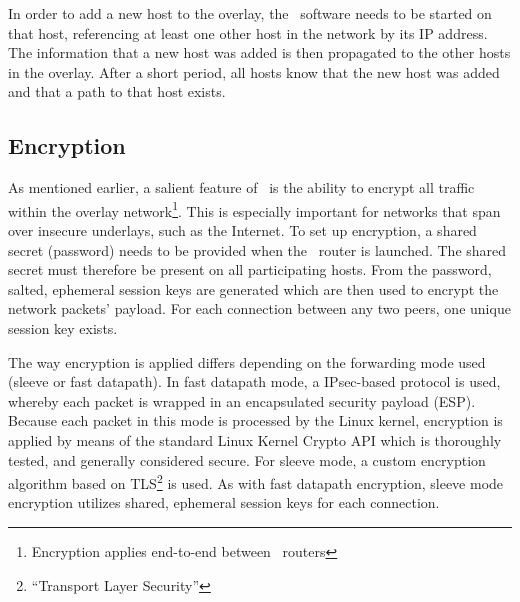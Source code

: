 In order to add a new host to the overlay, the \weave\ software needs to be started on that host, referencing at least one other host in the network by its IP address. The information that a new host was added is then propagated to the other hosts in the overlay. After a short period, all hosts know that the new host was added and that a path to that host exists.

\subsection{Encryption} 
As mentioned earlier, a salient feature of \wnet\ is the ability to encrypt all traffic within the overlay network\footnote{Encryption applies end-to-end between \weave\ routers}. This is especially important for networks that span over insecure underlays, such as the Internet. To set up encryption, a shared secret (password) needs to be provided when the \weave\ router is launched. The shared secret must therefore be present on all participating hosts. From the password, salted, ephemeral session keys are generated which are then used to encrypt the network packets' payload. For each connection between any two peers, one unique session key exists.

The way encryption is applied differs depending on the forwarding mode used (sleeve or fast datapath). In fast datapath mode, a IPsec-based protocol is used, whereby each packet is wrapped in an encapsulated security payload (ESP). Because each packet in this mode is processed by the Linux kernel, encryption is applied by means of the standard Linux Kernel Crypto API which is thoroughly tested, and generally considered secure. For sleeve mode, a custom encryption algorithm based on TLS\footnote{``Transport Layer Security''} is used. As with fast datapath encryption, sleeve mode encryption utilizes shared, ephemeral session keys for each connection.

